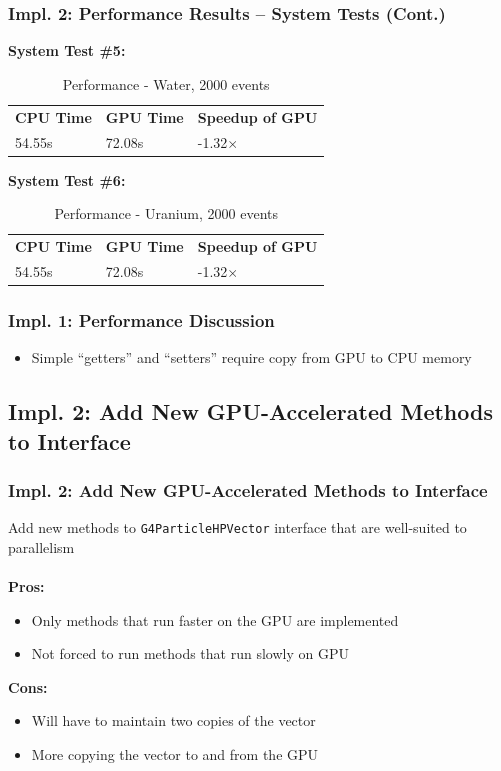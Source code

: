 \documentclass{beamer}
\newcommand\pro{\item[$+$]}
\newcommand\con{\item[$-$]}
\begin{document}
\begin{frame}
\frametitle{Impl. 2: Performance Results -- System Tests (Cont.)}
\textbf{System Test \#5:}\\
\begin{table}
		\caption{Performance - Water, 2000 events}
		\begin{tabular}{lll}
		\bf CPU Time&\bf  GPU Time&\bf Speedup of GPU\\
		54.55s&72.08s&-1.32$\times$\\
		\end{tabular}
\end{table}
\textbf{System Test \#6:}\\
\begin{table}
		\caption{Performance - Uranium, 2000 events}
		\begin{tabular}{lll}
		\bf CPU Time&\bf  GPU Time&\bf Speedup of GPU\\
		54.55s&72.08s&-1.32$\times$\\
		\end{tabular}
\end{table}
\end{frame}

\begin{frame}
\frametitle{Impl. 1: Performance Discussion}
\begin{itemize}
\item Simple ``getters'' and ``setters'' require copy from GPU to CPU memory
\end{itemize}
\end{frame}

\subsection{Impl. 2: Add New GPU-Accelerated Methods to Interface}
\begin{frame}
\frametitle{Impl. 2: Add New GPU-Accelerated Methods to Interface}
Add new methods to \texttt{G4ParticleHPVector} interface that are well-suited to parallelism\\~\\

\textbf{Pros:}
\begin{itemize}
\pro Only methods that run faster on the GPU are implemented
\pro Not forced to run methods that run slowly on GPU
\end{itemize}

\textbf{Cons:}
\begin{itemize}
\con Will have to maintain two copies of the vector
\con More copying the vector to and from the GPU
\end{itemize}
\end{frame}
\end{document}
